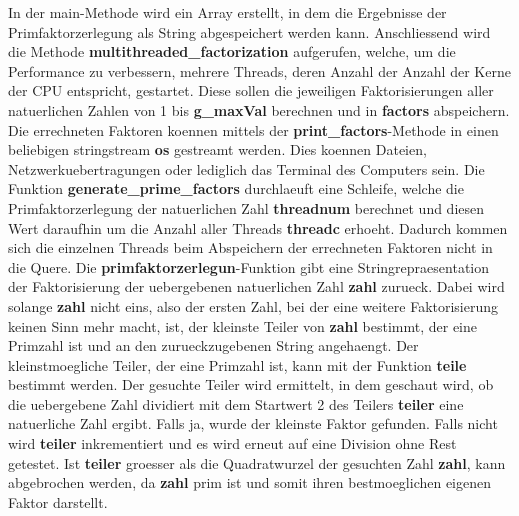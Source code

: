 In der main-Methode wird ein Array erstellt, in dem die Ergebnisse der Primfaktorzerlegung als String abgespeichert werden kann. Anschliessend wird die Methode \textbf{multithreaded\_factorization} aufgerufen, welche, um die Performance zu verbessern, mehrere Threads, deren Anzahl der Anzahl der Kerne der CPU entspricht, gestartet. Diese sollen die jeweiligen Faktorisierungen aller natuerlichen Zahlen von 1 bis \textbf{g\_maxVal} berechnen und in \textbf{factors} abspeichern. Die errechneten Faktoren koennen mittels der \textbf{print\_factors}-Methode in einen beliebigen stringstream \textbf{os} gestreamt werden. Dies koennen Dateien, Netzwerkuebertragungen oder lediglich das Terminal des Computers sein. Die Funktion \textbf{generate\_prime\_factors} durchlaeuft eine Schleife, welche die Primfaktorzerlegung der natuerlichen Zahl \textbf{threadnum} berechnet und diesen Wert daraufhin um die Anzahl aller Threads \textbf{threadc} erhoeht. Dadurch kommen sich die einzelnen Threads beim Abspeichern der errechneten Faktoren nicht in die Quere. Die \textbf{primfaktorzerlegun}-Funktion gibt eine Stringrepraesentation der Faktorisierung der uebergebenen natuerlichen Zahl \textbf{zahl} zurueck. Dabei wird solange \textbf{zahl} nicht eins, also der ersten Zahl, bei der eine weitere Faktorisierung keinen Sinn mehr macht, ist, der kleinste Teiler von \textbf{zahl} bestimmt, der eine Primzahl ist und an den zurueckzugebenen String angehaengt. Der kleinstmoegliche Teiler, der eine Primzahl ist, kann mit der Funktion \textbf{teile} bestimmt werden. Der gesuchte Teiler wird ermittelt, in dem geschaut wird, ob die uebergebene Zahl dividiert mit dem Startwert 2 des Teilers \textbf{teiler} eine natuerliche Zahl ergibt. Falls ja, wurde der kleinste Faktor gefunden. Falls nicht wird \textbf{teiler} inkrementiert und es wird erneut auf eine Division ohne Rest getestet. Ist \textbf{teiler} groesser als die Quadratwurzel der gesuchten Zahl \textbf{zahl}, kann abgebrochen werden, da \textbf{zahl} prim ist und somit ihren bestmoeglichen eigenen Faktor darstellt.